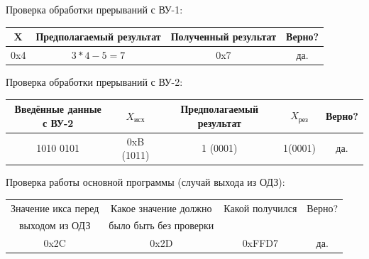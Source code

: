 Проверка обработки прерываний с ВУ-1:
\begin{center}
    \begin{tabular}{|c|c|c|c|}
        \hline
        X   & Предполагаемый результат & Полученный результат & Верно? \\
        \hline
        0x4 & $3*4-5=7$                & 0x7                  & да.    \\
        \hline
    \end{tabular}
\end{center}
Проверка обработки прерываний с ВУ-2:
\begin{center}
    \begin{tabular}{|c|c|c|c|c|}
        \hline
        Введённые данные с ВУ-2 & $X_{исх}$  & Предполагаемый результат & $X_{рез}$ & Верно? \\
        \hline
        1010 0101               & 0xB (1011) & 1 (0001)                 & 1(0001)   & да.    \\
        \hline
    \end{tabular}
\end{center}
Проверка работы основной программы (случай выхода из ОДЗ):
\begin{center}
    \begin{tabular}{|c|c|c|c|}
        \hline
        Значение икса перед & Какое значение должно  & Какой получился & Верно? \\
        выходом из ОДЗ      & было быть без проверки &                 &        \\
        \hline
        0x2C                & 0x2D                   & 0xFFD7          & да.    \\
        \hline
    \end{tabular}
\end{center}
